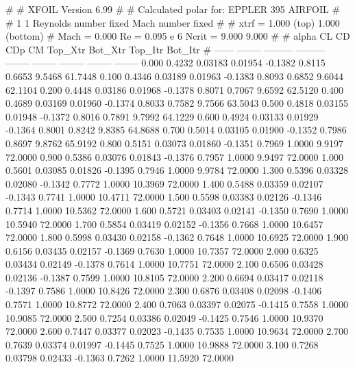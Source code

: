 #  
#       XFOIL         Version 6.99
#  
# Calculated polar for: EPPLER 395 AIRFOIL                              
#  
# 1 1 Reynolds number fixed          Mach number fixed         
#  
# xtrf =   1.000 (top)        1.000 (bottom)  
# Mach =   0.000     Re =     0.095 e 6     Ncrit =   9.000  9.000
#  
#   alpha    CL        CD       CDp       CM     Top_Xtr  Bot_Xtr  Top_Itr  Bot_Itr
#  ------ -------- --------- --------- -------- -------- -------- -------- --------
   0.000   0.4232   0.03183   0.01954  -0.1382   0.8115   0.6653   9.5468  61.7448
   0.100   0.4346   0.03189   0.01963  -0.1383   0.8093   0.6852   9.6044  62.1104
   0.200   0.4448   0.03186   0.01968  -0.1378   0.8071   0.7067   9.6592  62.5120
   0.400   0.4689   0.03169   0.01960  -0.1374   0.8033   0.7582   9.7566  63.5043
   0.500   0.4818   0.03155   0.01948  -0.1372   0.8016   0.7891   9.7992  64.1229
   0.600   0.4924   0.03133   0.01929  -0.1364   0.8001   0.8242   9.8385  64.8688
   0.700   0.5014   0.03105   0.01900  -0.1352   0.7986   0.8697   9.8762  65.9192
   0.800   0.5151   0.03073   0.01860  -0.1351   0.7969   1.0000   9.9197  72.0000
   0.900   0.5386   0.03076   0.01843  -0.1376   0.7957   1.0000   9.9497  72.0000
   1.000   0.5601   0.03085   0.01826  -0.1395   0.7946   1.0000   9.9784  72.0000
   1.300   0.5396   0.03328   0.02080  -0.1342   0.7772   1.0000  10.3969  72.0000
   1.400   0.5488   0.03359   0.02107  -0.1343   0.7741   1.0000  10.4711  72.0000
   1.500   0.5598   0.03383   0.02126  -0.1346   0.7714   1.0000  10.5362  72.0000
   1.600   0.5721   0.03403   0.02141  -0.1350   0.7690   1.0000  10.5940  72.0000
   1.700   0.5854   0.03419   0.02152  -0.1356   0.7668   1.0000  10.6457  72.0000
   1.800   0.5998   0.03430   0.02158  -0.1362   0.7648   1.0000  10.6925  72.0000
   1.900   0.6156   0.03435   0.02157  -0.1369   0.7630   1.0000  10.7357  72.0000
   2.000   0.6325   0.03434   0.02149  -0.1378   0.7614   1.0000  10.7751  72.0000
   2.100   0.6506   0.03428   0.02136  -0.1387   0.7599   1.0000  10.8105  72.0000
   2.200   0.6694   0.03417   0.02118  -0.1397   0.7586   1.0000  10.8426  72.0000
   2.300   0.6876   0.03408   0.02098  -0.1406   0.7571   1.0000  10.8772  72.0000
   2.400   0.7063   0.03397   0.02075  -0.1415   0.7558   1.0000  10.9085  72.0000
   2.500   0.7254   0.03386   0.02049  -0.1425   0.7546   1.0000  10.9370  72.0000
   2.600   0.7447   0.03377   0.02023  -0.1435   0.7535   1.0000  10.9634  72.0000
   2.700   0.7639   0.03374   0.01997  -0.1445   0.7525   1.0000  10.9888  72.0000
   3.100   0.7268   0.03798   0.02433  -0.1363   0.7262   1.0000  11.5920  72.0000
